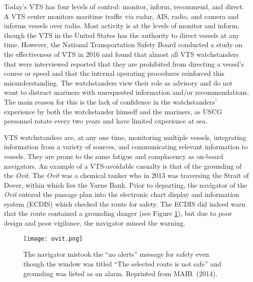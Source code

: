 \documentclass[twoside,symmetric,notoc]{tufte-book}
\begin{document}
\par{
Today's VTS has four levels of control: monitor, inform, recommend, and direct. A VTS center monitors maritime traffic via radar, AIS, radio, and camera and informs vessels over radio. Most activity is at the levels of monitor and inform, though the VTS in the United States has the authority to direct vessels at any time. However, the National Transportation Safety Board conducted a study on the effectiveness of VTS in 2016 and found that almost all VTS watchstanders that were interviewed reported that they are prohibited from directing a vessel's course or speed and that the internal operating procedures reinforced this misunderstanding. The watchstanders view their role as advisory and do not want to distract mariners with unrequested information and/or recommendations. The main reason for this is the lack of confidence in the watchstanders' experience by both the watchstander himself and the mariners, as USCG personnel rotate every two years and have limited experience at sea.\cite{NTSB_2016}
}
\par{%
VTS watchstanders are, at any one time, monitoring multiple vessels, integrating information from a variety of sources, and communicating relevant information to vessels. They are prone to the same fatigue and complacency as on-board navigators. An example of a VTS-avoidable casualty is that of the grounding of the \textit{Ovit}. The \textit{Ovit} was a chemical tanker who in 2013 was traversing the Strait of Dover, within which lies the Varne Bank. Prior to departing, the navigator of the \textit{Ovit} entered the passage plan into the electronic chart display and information system (ECDIS) which checked the route for safety. The ECDIS did indeed warn that the route contained a grounding danger (see Figure \ref{fig:ovit}), but due to poor design and poor vigilance, the navigator missed the warning.
\vspace{.1in}
\begin{figure}
	\centering
		\texttt{[image: ovit.png]}
	\caption[The navigator mistook the ``no alerts'' message for safety even though the window was titled ``The selected route is not safe'' and grounding was listed as an alarm.]{The navigator mistook the ``no alerts'' message for safety even though the window was titled ``The selected route is not safe'' and grounding was listed as an alarm. Reprinted from MAIB. (2014).}
	\label{fig:ovit}
\end{figure}
}
\end{document}

